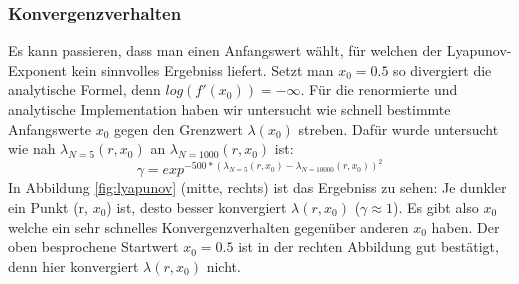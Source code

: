 \documentclass{scrartcl}
\begin{document}
\subsubsection{Konvergenzverhalten}
Es kann passieren, dass man einen Anfangswert wählt, für welchen der Lyapunov-Exponent kein sinnvolles Ergebniss liefert. Setzt man $x_0=0.5$ so divergiert die analytische Formel, denn $log(f'(x_0))=-\infty$.
Für die renormierte und analytische Implementation haben wir untersucht wie schnell bestimmte Anfangswerte $x_0$ gegen den Grenzwert $\lambda(x_0)$ streben. Dafür wurde untersucht wie nah $\lambda_{N=5}(r, x_0)$ an $\lambda_{N=1000}(r, x_0)$ ist:
\begin{equation}
    \gamma = exp^{-500 * (\lambda_{N=5}(r,x_0)
    - \lambda_{N=10000}(r,x_0))^2}
\end{equation}
In Abbildung \ref{fig:lyapunov} (mitte, rechts) ist das Ergebniss zu sehen: Je dunkler ein Punkt (r, $x_0$) ist, desto besser konvergiert $\lambda(r, x_0)$ ($\gamma \approx 1$). 
Es gibt also $x_0$ welche ein sehr schnelles Konvergenzverhalten gegenüber anderen $x_0$ haben. Der oben besprochene Startwert $x_0=0.5$ ist in der rechten Abbildung gut bestätigt, denn hier konvergiert $\lambda(r, x_0)$ nicht. 
\end{document}
